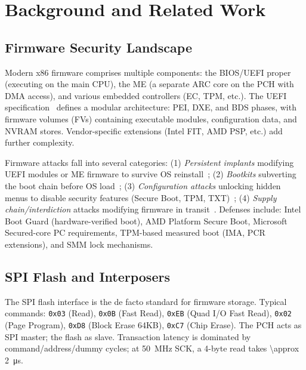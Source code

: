 \section{Background and Related Work}
\label{sec:background}

\subsection{Firmware Security Landscape}
Modern x86 firmware comprises multiple components: the \ac{BIOS}/\ac{UEFI} proper (executing on the main CPU), the \ac{ME} (a separate ARC core on the \ac{PCH} with DMA access), and various embedded controllers (\ac{EC}, \ac{TPM}, etc.). The \ac{UEFI} specification~\cite{uefi-spec} defines a modular architecture: \ac{PEI}, \ac{DXE}, and \ac{BDS} phases, with firmware volumes (FVs) containing executable modules, configuration data, and \ac{NVRAM} stores. Vendor-specific extensions (Intel FIT, AMD PSP, etc.) add further complexity.

Firmware attacks fall into several categories: (1) \textit{Persistent implants} modifying \ac{UEFI} modules or \ac{ME} firmware to survive OS reinstall~\cite{kallenberg2015firmware, wormley2018bios, kaspersky2022moonbounce}; (2) \textit{Bootkits} subverting the boot chain before OS load~\cite{rutkowska2008evil}; (3) \textit{Configuration attacks} unlocking hidden menus to disable security features (Secure Boot, \ac{TPM}, \ac{TXT})~\cite{coreboot, insyde-unlock}; (4) \textit{Supply chain/interdiction} attacks modifying firmware in transit~\cite{nsa-ant}. Defenses include: Intel Boot Guard (hardware-verified boot), AMD Platform Secure Boot, Microsoft Secured-core PC requirements, \ac{TPM}-based measured boot (\ac{IMA}, \ac{PCR} extensions), and \ac{SMM} lock mechanisms.

\subsection{SPI Flash and Interposers}
The \ac{SPI} flash interface is the de facto standard for firmware storage. Typical commands: \texttt{0x03} (Read), \texttt{0x0B} (Fast Read), \texttt{0xEB} (Quad I/O Fast Read), \texttt{0x02} (Page Program), \texttt{0xD8} (Block Erase 64KB), \texttt{0xC7} (Chip Erase). The \ac{PCH} acts as \ac{SPI} master; the flash as slave. Transaction latency is dominated by command/address/dummy cycles; at \SI{50}{MHz} SCK, a 4-byte read takes \SI{\approx 2}{\micro s}.

